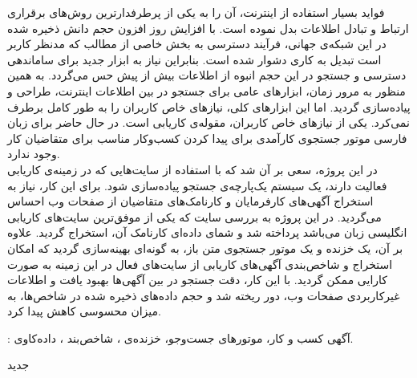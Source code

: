 

\pagestyle{empty}

\begin{center}
\end{center}
فواید بسیار استفاده از اینترنت، آن را به یکی از پرطرفدارترین روش‌های برقراری ارتباط و تبادل اطلاعات بدل نموده است. با افزایش روز افزون حجم دانش ذخیره شده در این شبکه‌ی جهانی، فرآیند دسترسی به بخش خاصی از مطالب که مدنظر کاربر است تبدیل به کاری دشوار شده است. بنابراین نیاز به ابزار جدید برای ساماندهی دسترسی و جستجو در این حجم انبوه از اطلاعات بیش از پیش حس می‌گردد. به همین منظور به مرور زمان، ابزارهای عامی برای جستجو در بین اطلاعات اینترنت، طراحی و پیاده‌سازی گردید. اما این ابزارهای کلی، نیازهای خاص کاربران را به طور کامل برطرف نمی‌کرد. یکی از نیازهای خاص کاربران، مقوله‌ی کاریابی است. در حال حاضر برای زبان فارسی موتور جستجوی کارآمدی برای پیدا کردن کسب‌وکار مناسب برای متقاضیان کار وجود ندارد.
\\
در این پروژه، سعی بر آن شد که با استفاده از سایت‌هایی که در زمینه‌ی کاریابی فعالیت دارند، یک سیستم یک‌پارچه‌ی جستجو پیاده‌سازی شود. برای این کار، نیاز به استخراج آگهی‌های کارفرمایان و کارنامک‌های متقاضیان از صفحات وب احساس می‌گردید. در این پروژه به بررسی سایت  که یکی از موفق‌ترین سایت‌های کاریابی انگلیسی زبان می‌باشد پرداخته شد و شمای داده‌ای کارنامک آن، استخراج گردید. علاوه بر آن، یک خزنده و یک موتور جستجوی متن باز، به گونه‌ای بهینه‌سازی گردید که امکان استخراج و شاخص‌بندی آگهی‌های کاریابی از سایت‌های فعال در این زمینه به صورت کارایی ممکن گردید. با این کار، دقت جستجو در بین آگهی‌ها بهبود یافت و اطلاعات غیرکاربردی صفحات وب، دور ریخته شد و حجم داده‌های ذخیره شده در شاخص‌ها، به میزان محسوسی کاهش پیدا کرد.

:
آگهی کسب و کار، موتورهای جست‌وجو، خزنده‌ی ، شاخص‌بند ، داده‌کاوی.


‌جدید